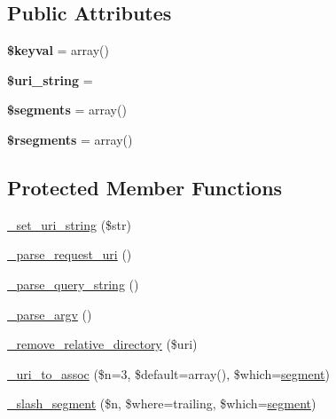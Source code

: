\subsection*{Public Attributes}
\begin{DoxyCompactItemize}
\item 
\mbox{\label{class_c_i___u_r_i_a943747f76165a82a49e94d2e8cbf77bd}} 
{\bfseries \$keyval} = array()
\item 
\mbox{\label{class_c_i___u_r_i_abc02e3fc6250bdab439b72a9e2a5d322}} 
{\bfseries \$uri\+\_\+string} = \textquotesingle{}\textquotesingle{}
\item 
\mbox{\label{class_c_i___u_r_i_ae22c2e47a5130c77c3de0014e61a738c}} 
{\bfseries \$segments} = array()
\item 
\mbox{\label{class_c_i___u_r_i_ae0782e266beed00a8054fd33e11a8547}} 
{\bfseries \$rsegments} = array()
\end{DoxyCompactItemize}
\subsection*{Protected Member Functions}
\begin{DoxyCompactItemize}
\item 
\mbox{\hyperlink{class_c_i___u_r_i_adf23e2984cbd3fc7132ec63f20861820}{\+\_\+set\+\_\+uri\+\_\+string}} (\$str)
\item 
\mbox{\hyperlink{class_c_i___u_r_i_a748eb53a397eb43f17f861c45164bf52}{\+\_\+parse\+\_\+request\+\_\+uri}} ()
\item 
\mbox{\hyperlink{class_c_i___u_r_i_a9c0e85e7308d364034202fe5f436dcfb}{\+\_\+parse\+\_\+query\+\_\+string}} ()
\item 
\mbox{\hyperlink{class_c_i___u_r_i_a2d43a803a6b03667723786fc115a9bac}{\+\_\+parse\+\_\+argv}} ()
\item 
\mbox{\hyperlink{class_c_i___u_r_i_a8003a54383ffb2303e59ff5898b1aa88}{\+\_\+remove\+\_\+relative\+\_\+directory}} (\$uri)
\item 
\mbox{\hyperlink{class_c_i___u_r_i_a790fde20fba5dc67124caefa0129e96a}{\+\_\+uri\+\_\+to\+\_\+assoc}} (\$n=3, \$default=array(), \$which=\textquotesingle{}\mbox{\hyperlink{class_c_i___u_r_i_ae402f8ce148e7b6dccfb27978cbcd5a0}{segment}}\textquotesingle{})
\item 
\mbox{\hyperlink{class_c_i___u_r_i_a569cd1cd93650e9791b9dc7379913a81}{\+\_\+slash\+\_\+segment}} (\$n, \$where=\textquotesingle{}trailing\textquotesingle{}, \$which=\textquotesingle{}\mbox{\hyperlink{class_c_i___u_r_i_ae402f8ce148e7b6dccfb27978cbcd5a0}{segment}}\textquotesingle{})
\end{DoxyCompactItemize}
